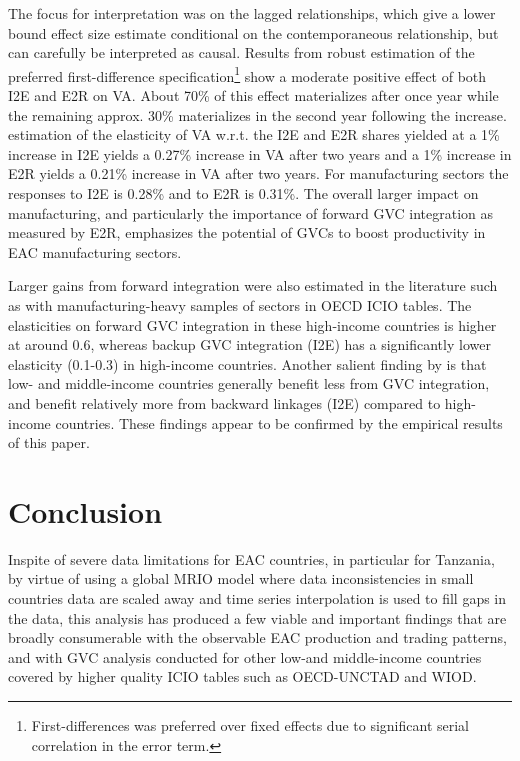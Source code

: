 \documentclass[a4paper]{article}
\begin{document}
The focus for interpretation was on the lagged relationships, which give a lower bound effect size estimate conditional on the contemporaneous relationship, but can carefully be interpreted as causal. Results from robust estimation of the preferred first-difference specification\footnote{First-differences was preferred over fixed effects due to significant serial correlation in the error term.} show a moderate positive effect of both I2E and E2R on VA. About 70\% of this effect materializes after once year while the remaining approx. 30\% materializes in the second year following the increase. estimation of the elasticity of VA w.r.t. the I2E and E2R shares yielded at a 1\% increase in I2E yields a 0.27\% increase in VA after two years and a 1\% increase in E2R yields a 0.21\% increase in VA after two years. For manufacturing sectors the responses to I2E is 0.28\% and to E2R is 0.31\%. The overall larger impact on manufacturing, and particularly the importance of forward GVC integration as measured by E2R, emphasizes the potential of GVCs to boost productivity in EAC manufacturing sectors. \newline

Larger gains from forward integration were also estimated in the literature such as \citet{Kummritz20161} with manufacturing-heavy samples of sectors in OECD ICIO tables. The elasticities on forward GVC integration in these high-income countries is higher at around 0.6, whereas backup GVC integration (I2E) has a significantly lower elasticity (0.1-0.3) in high-income countries. Another salient finding by \citet{kummritz2015global} is that low- and middle-income countries generally benefit less from GVC integration, and benefit relatively more from backward linkages (I2E) compared to high-income countries. These findings appear to be confirmed by the empirical results of this paper. \newpage

\section{Conclusion} 

Inspite of severe data limitations for EAC countries, in particular for Tanzania, by virtue of using a global MRIO model where data inconsistencies in small countries data are scaled away and time series interpolation is used to fill gaps in the data, this analysis has produced a few viable and important findings that are broadly consumerable with the observable EAC production and trading patterns, and  with GVC analysis conducted for other low-and middle-income countries covered by higher quality ICIO tables such as OECD-UNCTAD and WIOD. \newline
\end{document}
